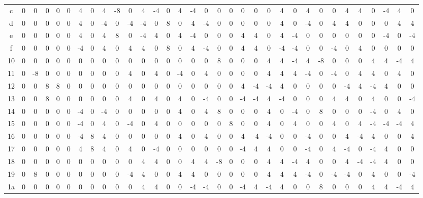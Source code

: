 \documentclass[11pt]{article}
\begin{document}
\begin{table}[htbp]
{\begin{tabular}{c|*{32}{c}}
    c & 0 & 0 & 0 & 0 & 0 & 4 & 0 & 4 & -8 & 0 & 4 & -4 & 0 & 4 & -4 & 0 & 0 & 0 & 0 & 0 & 0 & 4 & 0 & 4 & 0 & 0 & 4 & 4 & 0 & -4 & 4 & 0 \\
    d & 0 & 0 & 0 & 0 & 0 & 4 & 0 & -4 & 0 & -4 & -4 & 0 & 8 & 0 & 4 & -4 & 0 & 0 & 0 & 0 & 0 & 4 & 0 & -4 & 0 & 4 & 4 & 0 & 0 & 0 & 4 & 4 \\
    e & 0 & 0 & 0 & 0 & 0 & 4 & 0 & 4 & 8 & 0 & -4 & 4 & 0 & 4 & -4 & 0 & 0 & 0 & 4 & 4 & 0 & 4 & -4 & 0 & 0 & 0 & 0 & 0 & 0 & -4 & 0 & -4 \\
    f & 0 & 0 & 0 & 0 & 0 & -4 & 0 & 4 & 0 & 4 & 4 & 0 & 8 & 0 & 4 & -4 & 0 & 0 & 4 & 4 & 0 & -4 & -4 & 0 & 0 & -4 & 0 & 4 & 0 & 0 & 0 & 0 \\
    10 & 0 & 0 & 0 & 0 & 0 & 0 & 0 & 0 & 0 & 0 & 0 & 0 & 0 & 0 & 0 & 0 & 8 & 0 & 0 & 0 & 4 & 4 & -4 & 4 & -8 & 0 & 0 & 0 & 4 & 4 & -4 & 4 \\
    11 & 0 & -8 & 0 & 0 & 0 & 0 & 0 & 0 & 0 & 4 & 0 & 4 & 0 & -4 & 0 & 4 & 0 & 0 & 0 & 0 & 4 & 4 & 4 & -4 & 0 & -4 & 0 & 4 & 4 & 0 & 4 & 0 \\
    12 & 0 & 0 & 8 & 8 & 0 & 0 & 0 & 0 & 0 & 0 & 0 & 0 & 0 & 0 & 0 & 0 & 0 & 0 & 4 & -4 & -4 & 4 & 0 & 0 & 0 & 0 & -4 & 4 & -4 & 4 & 0 & 0 \\
    13 & 0 & 0 & 8 & 0 & 0 & 0 & 0 & 0 & 0 & 4 & 0 & 4 & 0 & 4 & 0 & -4 & 0 & 0 & -4 & -4 & 4 & -4 & 0 & 0 & 0 & 4 & 4 & 0 & 4 & 0 & 0 & -4 \\
    14 & 0 & 0 & 0 & 0 & 0 & -4 & 0 & -4 & 0 & 0 & 0 & 0 & 0 & 4 & 0 & 4 & 8 & 0 & 0 & 0 & 4 & 0 & -4 & 0 & 8 & 0 & 0 & 0 & -4 & 0 & 4 & 0 \\
    15 & 0 & 0 & 0 & 0 & 0 & -4 & 0 & 4 & 0 & -4 & 0 & 4 & 0 & 0 & 0 & 0 & 0 & 8 & 0 & 0 & 4 & 0 & 4 & 0 & 0 & 4 & 0 & 4 & -4 & -4 & -4 & 4 \\
    16 & 0 & 0 & 0 & 0 & 0 & -4 & 8 & 4 & 0 & 0 & 0 & 0 & 0 & 4 & 0 & 4 & 0 & 0 & 4 & -4 & -4 & 0 & 0 & -4 & 0 & 0 & 4 & -4 & 4 & 0 & 0 & 4 \\
    17 & 0 & 0 & 0 & 0 & 0 & 4 & 8 & 4 & 0 & 4 & 0 & -4 & 0 & 0 & 0 & 0 & 0 & 0 & -4 & 4 & 4 & 0 & 0 & -4 & 0 & 4 & -4 & 0 & -4 & 4 & 0 & 0 \\
    18 & 0 & 0 & 0 & 0 & 0 & 0 & 0 & 0 & 0 & 0 & 4 & 4 & 0 & 0 & 4 & 4 & -8 & 0 & 0 & 0 & 4 & 4 & -4 & 4 & 0 & 0 & 4 & -4 & -4 & 4 & 0 & 0 \\
    19 & 0 & 8 & 0 & 0 & 0 & 0 & 0 & 0 & 0 & -4 & 4 & 0 & 0 & 4 & 4 & 0 & 0 & 0 & 0 & 0 & 4 & 4 & 4 & -4 & 0 & -4 & -4 & 0 & 4 & 0 & 0 & -4 \\
    1a & 0 & 0 & 0 & 0 & 0 & 0 & 0 & 0 & 0 & 0 & 4 & 4 & 0 & 0 & -4 & -4 & 0 & 0 & -4 & 4 & -4 & 4 & 0 & 0 & 8 & 0 & 0 & 0 & 4 & 4 & -4 & 4 \\

\end{tabular}}
\end{table}
\end{document}
